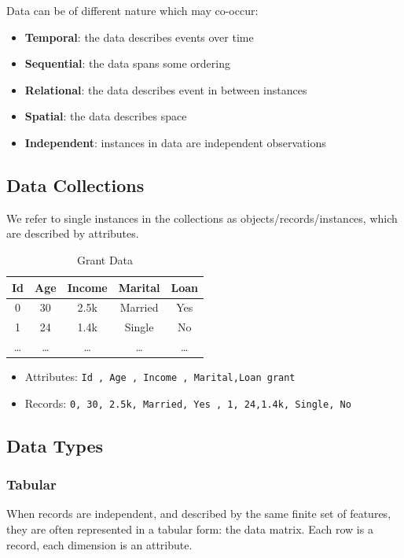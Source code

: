 Data can be of different nature which may co-occur:
\begin{itemize}
	\item \textbf{Temporal}: the data describes events over time
	\item \textbf{Sequential}: the data spans some ordering
	\item \textbf{Relational}: the data describes event in between instances
	\item \textbf{Spatial}: the data describes space
	\item \textbf{Independent}: instances in data are independent observations
\end{itemize}

\subsection{Data Collections}
We refer to single instances in the collections as objects/records/instances, which are
described by attributes.

\begin{table}[h!]
\centering
\begin{tabular}{ccccc}
\toprule
\textbf{Id} & \textbf{Age} & \textbf{Income} & \textbf{Marital} & \textbf{Loan} \\
\midrule
0 & 30 & 2.5k & Married & Yes \\
1 & 24 & 1.4k & Single  & No  \\
\ldots & \ldots & \ldots & \ldots & \ldots \\
\bottomrule
\end{tabular}
\caption{Grant Data}
\end{table}

\begin{itemize}
	\item Attributes: \lstinline|Id , Age , Income , Marital,Loan grant|
	\item Records: \lstinline|0, 30, 2.5k, Married, Yes , 1, 24,1.4k, Single, No|
\end{itemize}

\subsection{Data Types}
\subsubsection{Tabular}
When records are independent, and described by the same finite set of features, they
are often represented in a tabular form: the data matrix. Each row is a record, each
dimension is an attribute.


